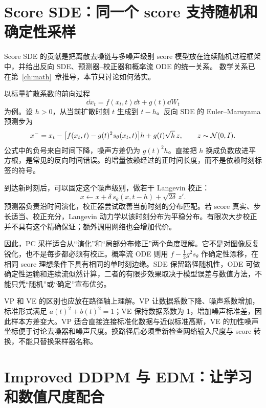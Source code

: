 \section{Score SDE：同一个 score 支持随机和确定性采样}
\label{sec:m-score-sde}

Score SDE 的贡献是把离散去噪链与多噪声级别 score 模型放在连续随机过程框架中，并给出反向 SDE、预测器--校正器和概率流 ODE 的统一关系。\cite{r_sde} 数学关系已在第~\ref{ch:math}~章推导，本节只讨论如何落实。

以标量扩散系数的前向过程
\[
 \dd x_t=f(x_t,t)\dd t+g(t)\dd W_t
\]
为例。设 $h>0$，从当前扩散时刻 $t$ 生成到 $t-h$。反向 SDE 的 Euler--Maruyama 预测步为
\begin{equation}
x^- = x_t-\bigl[f(x_t,t)-g(t)^2s_\theta(x_t,t)\bigr]h
      +g(t)\sqrt h\,z,\qquad z\sim\mathcal{N}(0,I).
\label{eq:m-em}
\end{equation}
公式中的负号来自时间下降，噪声方差仍为 $g(t)^2h$。直接把 $h$ 换成负数放进平方根，是常见的反向时间错误。的增量依赖经过的正时间长度，而不是依赖时刻标签的符号。

到达新时刻后，可以固定这个噪声级别，做若干 Langevin 校正：
\begin{equation}
x\leftarrow x+\delta\,s_\theta(x,t-h)+\sqrt{2\delta}\,z'.
\label{eq:m-langevin}
\end{equation}
预测器负责沿时间演化，校正器尝试改善当前时刻的分布匹配。若 score 真实、步长适当、校正充分，Langevin 动力学以该时刻分布为平稳分布。有限次大步校正并不具有这个精确保证；额外调用网络也会增加代价。

因此，PC 采样适合从“演化”和“局部分布修正”两个角度理解。它不是对图像反复锐化，也不是每步都必须有校正。概率流 ODE 则用
$f-\frac12g^2s_\theta$ 作确定性漂移，在相同 score 理想条件下具有相同的单时刻边缘。SDE 保留路径随机性，ODE 可做确定性运输和连续流似然计算，二者的有限步效果取决于模型误差与数值方法，不能只凭“随机”或“确定”宣布优劣。

VP 和 VE 的区别也应放在路径轴上理解。VP 让数据系数下降、噪声系数增加，标准形式满足 $a(t)^2+b(t)^2=1$；VE 保持数据系数为 1，增加噪声标准差，因此样本方差变大。VP 适合直接连接标准化数据与近似标准高斯，VE 的加性噪声坐标便于讨论去噪器和噪声尺度。换路径后必须重新检查网络输入尺度与 score 转换，不能只替换采样器名称。

\section{Improved DDPM 与 EDM：让学习和数值尺度配合}
\label{sec:m-design}

